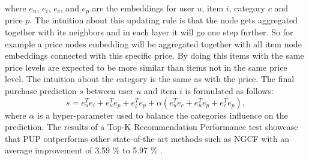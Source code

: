 where $e_u$, $e_i$, $e_c$, and $e_p$ are the embeddings for user $u$, item $i$, category $c$ and price $p$.
The intuition about this updating rule is that the node gets aggregated together with its neighbors and in each layer it will go one step further.
So for example a price nodes embedding will be aggregated together with all item node embeddings connected with this specific price.
By doing this items with the same price levels are expected to be more similar than items not in the same price level.
The intuition about the category is the same as with the price.
The final purchase prediction $s$ between user $u$ and item $i$ is formulated as follows:
\begin{equation}
    s = e^T_u e_i + e^T_u e_p + e^T_i e_p + \alpha (e^T_u e_c + e^T_u e_p + e^T_c e_p),
\end{equation}
where $\alpha$ is a hyper-parameter used to balance the categories influence on the prediction.
The results of a Top-K Recommendation Performance test showcase that PUP outperforms other state-of-the-art methods such as NGCF with an average improvement of 3.59 \% to 5.97 \% \cite{Priceaware}.
